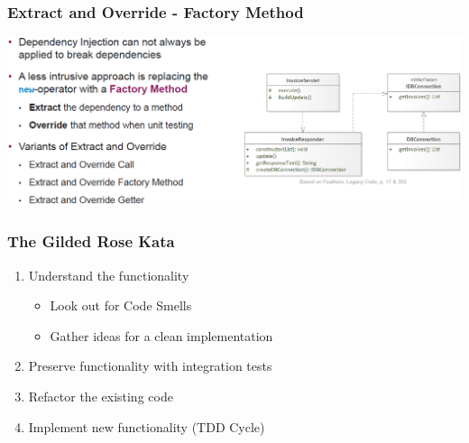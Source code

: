 \subsubsection{Extract and Override - Factory Method}
\includegraphics[width=\linewidth]{../img/extract_and_override.png}

\subsubsection{The Gilded Rose Kata}
\begin{enumerate}
    \item Understand the functionality
    \begin{itemize}
        \item Look out for Code Smells
        \item Gather ideas for a clean implementation
    \end{itemize}
    \item Preserve functionality with integration tests
    \item Refactor the existing code
    \item Implement new functionality (TDD Cycle)
\end{enumerate}